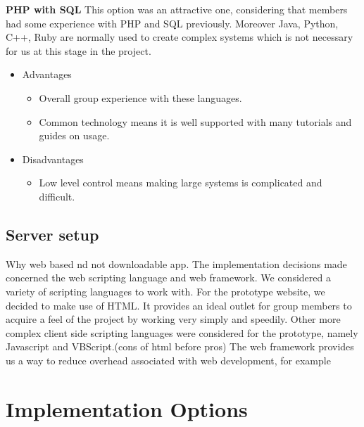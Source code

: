 \documentclass[12pt]{article}
\begin{document}
\newpage
\textbf{PHP with SQL}
\newline
\newline
This option was an attractive one, considering that members had some experience with PHP and SQL previously. Moreover Java, Python, C++, Ruby are normally used to create complex systems which is not necessary for us 
at this stage in the project.
\begin{itemize}
\item Advantages
	\begin{itemize}
	\item Overall group experience with these languages. 
	\item Common technology means it is well supported with many tutorials and guides on usage.
	\end {itemize}
\item Disadvantages
	\begin{itemize}
	\item Low level control means making large systems is complicated and difficult.
	\end {itemize}
\end {itemize}
\subsection{Server setup}

Why web based nd not downloadable app. The implementation decisions made concerned the web scripting language and web framework. 
We considered a variety of scripting languages to work with. For the prototype website, we decided to make use of HTML. It provides an ideal outlet for group members to acquire a feel of the project by working very simply and speedily. Other more complex client side scripting languages were considered for the prototype, namely Javascript and VBScript.(cons of html before pros)
The web framework provides us a way to reduce overhead associated with web development, for example 
\newpage

\section{Implementation Options}
\vspace {5 mm}
\end{document}

